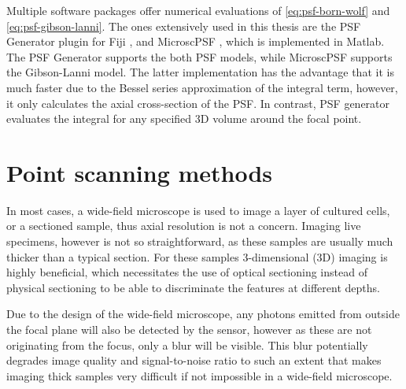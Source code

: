     Multiple software packages offer numerical evaluations of \autoref{eq:psf-born-wolf} and \autoref{eq:psf-gibson-lanni}. The ones extensively used in this thesis are the PSF Generator plugin \cite{kirshner_3d_2011} for Fiji \cite{schindelin_fiji:_2012}, and MicroscPSF \cite{li_fast_2017}, which is implemented in Matlab. The PSF Generator supports the both PSF models, while MicroscPSF supports the Gibson-Lanni model. The latter implementation has the advantage that it is much faster due to the Bessel series approximation of the integral term, however, it only calculates the axial cross-section of the PSF. In contrast, PSF generator evaluates the integral for any specified 3D volume around the focal point.
    




\section{Point scanning methods}
  In most cases, a wide-field microscope is used to image a layer of cultured cells, or a sectioned sample, thus axial resolution is not a concern. Imaging live specimens, however is not so straightforward, as these samples are usually much thicker than a typical section. For these samples 3-dimensional (3D) imaging is highly beneficial, which necessitates the use of optical sectioning instead of physical sectioning to be able to discriminate the features at different depths.


  Due to the design of the wide-field microscope, any photons emitted from outside the focal plane will also be detected by the sensor, however as these are not originating from the focus, only a blur will be visible. This blur potentially degrades image quality and signal-to-noise ratio to such an extent that makes imaging thick samples very difficult if not impossible in a wide-field microscope. 


